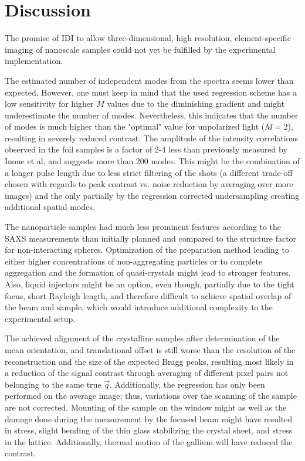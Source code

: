 \chapter{Discussion}
The promise of IDI to allow three-dimensional, high resolution, element-specific imaging of nanoscale samples could not yet be fulfilled by the experimental implementation.

The estimated number of independent modes from the spectra seems lower than expected. However, one must keep in mind that the used regression scheme has a low sensitivity for higher $M$ values due to the diminishing gradient and might underestimate the number of modes. Nevertheless, this indicates that the number of modes is much higher than the "optimal" value for unpolarized light ($M=2$), resulting in severely reduced contrast. The amplitude of the intensity correlations observed in the foil samples is a factor of 2-4 less than previously measured by Inoue et al. and suggests more than 200 modes. This might be the combination of a longer pulse length due to less strict filtering of the shots (a different trade-off chosen with regards to peak contrast vs. noise reduction by averaging over more images) and the only partially by the regression corrected undersampling creating additional spatial modes.

The nanoparticle samples had much less prominent features according to the SAXS measurements than initially planned and compared to the structure factor for non-interacting spheres. Optimization of the preparation method leading to either higher concentrations of non-aggregating particles or to complete aggregation and the formation of quasi-crystals might lead to stronger features. Also, liquid injectors might be an option, even though, partially due to the tight focus, short Rayleigh length, and therefore difficult to achieve spatial overlap of the beam and sample, which would introduce additional complexity to the experimental setup.

The achieved alignment of the crystalline samples after determination of the mean orientation, and translational offset is still worse than the resolution of the reconstruction and the size of the expected Bragg peaks, resulting most likely in a reduction of the signal contrast through averaging of different pixel pairs not belonging to the same true $\vec{q}$. Additionally, the regression has only been performed on the average image; thus, variations over the scanning of the sample are not corrected. Mounting of the sample on the window might as well as the damage done during the measurement by the focused beam might have resulted in stress, slight bending of the thin glass stabilizing the crystal sheet, and stress in the lattice. Additionally, thermal motion of the gallium will have reduced the contrast.

